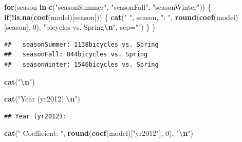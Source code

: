 \documentclass[
]{article}
\newenvironment{Shaded}{\begin{snugshade}}{\end{snugshade}}
\newcommand{\AttributeTok}[1]{\textcolor[rgb]{0.13,0.29,0.53}{#1}}
\newcommand{\ControlFlowTok}[1]{\textcolor[rgb]{0.13,0.29,0.53}{\textbf{#1}}}
\newcommand{\DecValTok}[1]{\textcolor[rgb]{0.00,0.00,0.81}{#1}}
\newcommand{\FunctionTok}[1]{\textcolor[rgb]{0.13,0.29,0.53}{\textbf{#1}}}
\newcommand{\NormalTok}[1]{#1}
\newcommand{\SpecialCharTok}[1]{\textcolor[rgb]{0.81,0.36,0.00}{\textbf{#1}}}
\newcommand{\StringTok}[1]{\textcolor[rgb]{0.31,0.60,0.02}{#1}}
\begin{document}
\begin{Shaded}
\begin{Highlighting}[]
\ControlFlowTok{for}\NormalTok{(season }\ControlFlowTok{in} \FunctionTok{c}\NormalTok{(}\StringTok{"seasonSummer"}\NormalTok{, }\StringTok{"seasonFall"}\NormalTok{, }\StringTok{"seasonWinter"}\NormalTok{)) \{}
  \ControlFlowTok{if}\NormalTok{(}\SpecialCharTok{!}\FunctionTok{is.na}\NormalTok{(}\FunctionTok{coef}\NormalTok{(model)[season])) \{}
    \FunctionTok{cat}\NormalTok{(}\StringTok{"  "}\NormalTok{, season, }\StringTok{": "}\NormalTok{, }\FunctionTok{round}\NormalTok{(}\FunctionTok{coef}\NormalTok{(model)[season], }\DecValTok{0}\NormalTok{), }\StringTok{"bicycles vs. Spring}\SpecialCharTok{\textbackslash{}n}\StringTok{"}\NormalTok{, }\AttributeTok{sep=}\StringTok{""}\NormalTok{)}
\NormalTok{  \}}
\NormalTok{\}}
\end{Highlighting}
\end{Shaded}

\begin{verbatim}
##   seasonSummer: 1138bicycles vs. Spring
##   seasonFall: 844bicycles vs. Spring
##   seasonWinter: 1546bicycles vs. Spring
\end{verbatim}

\begin{Shaded}
\begin{Highlighting}[]
\FunctionTok{cat}\NormalTok{(}\StringTok{"}\SpecialCharTok{\textbackslash{}n}\StringTok{"}\NormalTok{)}
\end{Highlighting}
\end{Shaded}

\begin{Shaded}
\begin{Highlighting}[]
\FunctionTok{cat}\NormalTok{(}\StringTok{"Year (yr2012):}\SpecialCharTok{\textbackslash{}n}\StringTok{"}\NormalTok{)}
\end{Highlighting}
\end{Shaded}

\begin{verbatim}
## Year (yr2012):
\end{verbatim}

\begin{Shaded}
\begin{Highlighting}[]
\FunctionTok{cat}\NormalTok{(}\StringTok{"  Coefficient: "}\NormalTok{, }\FunctionTok{round}\NormalTok{(}\FunctionTok{coef}\NormalTok{(model)[}\StringTok{"yr2012"}\NormalTok{], }\DecValTok{0}\NormalTok{), }\StringTok{"}\SpecialCharTok{\textbackslash{}n}\StringTok{"}\NormalTok{)}
\end{Highlighting}
\end{Shaded}
\end{document}
